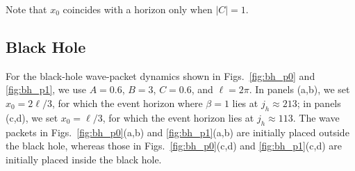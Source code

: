 \documentclass[reprint,amsmath,amssymb,aps,prb,floatfix,showkeys,superscriptaddress]{revtex4-2}
\begin{document}
Note that $x_0$ coincides with a horizon only when $|C|=1$.

\subsection{Black Hole}
For the black-hole wave-packet dynamics shown in Figs.~\ref{fig:bh_p0} and \ref{fig:bh_p1}, we use $A=0.6$, $B=3$, $C=0.6$, and $\ell=2\pi$. In panels (a,b), we set $x_0=2\ell/3$, for which the event horizon where $\beta=1$ lies at $j_h\approx213$; in panels (c,d), we set $x_0=\ell/3$, for which the event horizon lies at $j_h\approx113$. The wave packets in Figs.~\ref{fig:bh_p0}(a,b) and \ref{fig:bh_p1}(a,b) are initially placed outside the black hole, whereas those in Figs.~\ref{fig:bh_p0}(c,d) and \ref{fig:bh_p1}(c,d) are initially placed inside the black hole.
\end{document}
